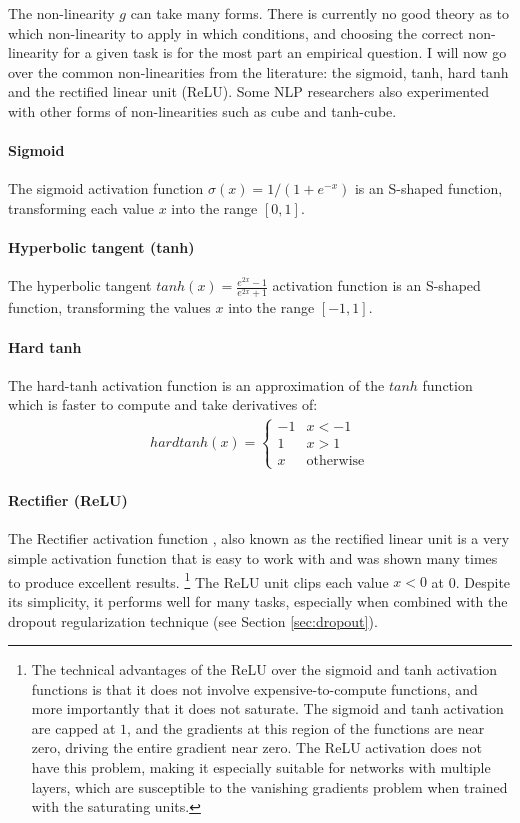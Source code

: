 \documentclass[jair,twoside,11pt,theapa]{article}
\begin{document}
{The non-linearity $g$ can take many forms. There is currently no good theory as
to which non-linearity to apply in which conditions, and choosing the correct
non-linearity for a given task is for the most part an empirical question. I
will now go over the common non-linearities from the literature: the sigmoid,
tanh, hard tanh and the rectified linear unit (ReLU). Some NLP researchers also
experimented with other forms of non-linearities such as cube and tanh-cube.

\paragraph{Sigmoid} The sigmoid activation function $\sigma(x) = 1/(1+e^{-x})$ is an
S-shaped function, transforming each value $x$ into the range $[0,1]$.

\paragraph{Hyperbolic tangent (tanh)} The hyperbolic tangent $tanh(x) =
\frac{e^{2x}-1}{e^{2x}+1}$  activation
function is an S-shaped function, transforming the values $x$ into the range $[-1,1]$.

\paragraph{Hard tanh} The hard-tanh activation function is an approximation of
the $tanh$ function which is faster to compute and take derivatives of:
\begin{align*}
    hardtanh(x) = \begin{cases}
        -1 &  x < -1 \\
        1  &  x > 1 \\
        x  & \text{otherwise}
    \end{cases}
\end{align*}

\paragraph{Rectifier (ReLU)} The Rectifier activation function \cite{glorot2011deep}, also known as
the rectified linear unit is a very simple activation function that is easy to
work with and was shown many times to produce excellent results.%
\footnote{The technical 
advantages of the ReLU over the sigmoid and tanh activation functions is that it
does not involve expensive-to-compute functions, and more importantly that it 
does not saturate.  The sigmoid and tanh activation are capped at $1$, and
the gradients at this region of the functions are near zero, driving the entire
gradient near zero.  The ReLU activation does not have this problem, making it
especially suitable for networks with multiple layers, which are 
susceptible to the vanishing gradients problem when trained with the saturating
units.}
The ReLU unit
clips each value $x < 0$ at 0.  Despite its simplicity, it performs well for many
tasks, especially when combined with the dropout regularization technique 
(see Section \ref{sec:dropout}).

}
\end{document}
